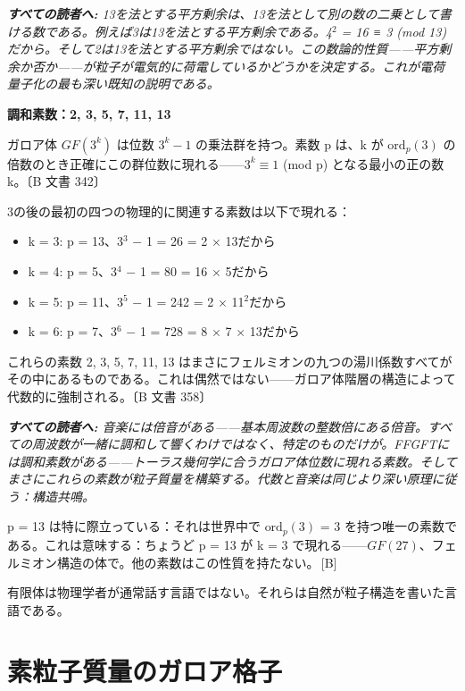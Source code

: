 \documentclass[11pt,openany]{book}
\newcommand{\status}[1]{\penalty10000\,{\tiny\textcolor{gray!70}{[#1]}}}
\newenvironment{laierspur}{%
  \par\vspace{4pt}%
  \noindent\small\itshape\color{blue!60!black}%
  \textbf{すべての読者へ:}\enspace\ignorespaces}{%
  \par\vspace{4pt}\normalsize\normalfont\normalcolor}
\begin{document}
\begin{laierspur}
13を法とする平方剰余は、13を法として別の数の二乗として書ける数である。例えば3は13を法とする平方剰余である。4$^2$ = 16 ≡ 3 (mod 13)だから。そして2は13を法とする平方剰余ではない。この数論的性質——平方剰余か否か——が粒子が電気的に荷電しているかどうかを決定する。これが電荷量子化の最も深い既知の説明である。
\end{laierspur}

\textbf{調和素数：{2, 3, 5, 7, 11, 13}}

ガロア体 $GF(3^k)$ は位数 $3^k - 1$ の乗法群を持つ。素数 p は、k が $\text{ord}_p(3)$ の倍数のとき正確にこの群位数に現れる——$3^k \equiv 1$ (mod p) となる最小の正の数 k。〔B 文書 342〕

3の後の最初の四つの物理的に関連する素数は以下で現れる：
\begin{itemize}
\item k = 3: p = 13、3$^3$ $-$ 1 = 26 = 2 $\times$ 13だから
\item k = 4: p = 5、3$^4$ $-$ 1 = 80 = 16 $\times$ 5だから
\item k = 5: p = 11、3$^5$ $-$ 1 = 242 = 2 $\times$ 11$^2$だから
\item k = 6: p = 7、3$^6$ $-$ 1 = 728 = 8 $\times$ 7 $\times$ 13だから
\end{itemize}

これらの素数 {2, 3, 5, 7, 11, 13} はまさにフェルミオンの九つの湯川係数すべてがその中にあるものである。これは偶然ではない——ガロア体階層の構造によって代数的に強制される。〔B 文書 358〕

\begin{laierspur}
音楽には倍音がある——基本周波数の整数倍にある倍音。すべての周波数が一緒に調和して響くわけではなく、特定のものだけが。FFGFTには調和素数がある——トーラス幾何学に合うガロア体位数に現れる素数。そしてまさにこれらの素数が粒子質量を構築する。代数と音楽は同じより深い原理に従う：構造共鳴。
\end{laierspur}

p = 13 は特に際立っている：それは世界中で $\text{ord}_p(3)$ = 3 を持つ唯一の素数である。これは意味する：ちょうど p = 13 が k = 3 で現れる——$GF(27)$、フェルミオン構造の体で。他の素数はこの性質を持たない。\status{B}

有限体は物理学者が通常話す言語ではない。それらは自然が粒子構造を書いた言語である。

\medskip

\chapter{素粒子質量のガロア格子}
\end{document}

